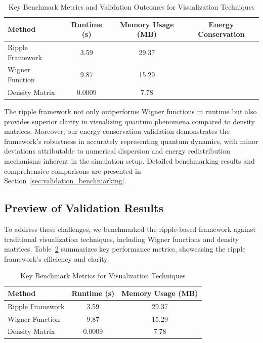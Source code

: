 \documentclass[12pt]{article}
\newcommand{\cmark}{\ding{51}} %
\newcommand{\xmark}{\ding{55}} %
\begin{document}
\begin{table}[H]
\centering
\caption{Key Benchmark Metrics and Validation Outcomes for Visualization Techniques}
\begin{tabular}{|l|c|c|c|}
    \hline
    \textbf{Method} & \textbf{Runtime (s)} & \textbf{Memory Usage (MB)} & \textbf{Energy Conservation} \\
    \hline
    Ripple Framework    & 3.59        & 29.37             & \cmark \\
    Wigner Function     & 9.87        & 15.29             & \xmark \\
    Density Matrix      & 0.0009      & 7.78              & \xmark \\
    \hline
\end{tabular}
\label{tab:validation_results}
\end{table}

The ripple framework not only outperforms Wigner functions in runtime but also provides superior clarity in visualizing quantum phenomena compared to density matrices. Moreover, our energy conservation validation demonstrates the framework's robustness in accurately representing quantum dynamics, with minor deviations attributable to numerical dispersion and energy redistribution mechanisms inherent in the simulation setup. Detailed benchmarking results and comprehensive comparisons are presented in Section~\ref{sec:validation_benchmarking}.

\subsection{Preview of Validation Results}
To address these challenges, we benchmarked the ripple-based framework against traditional visualization techniques, including Wigner functions and density matrices. Table~\ref{tab:preview_results} summarizes key performance metrics, showcasing the ripple framework's efficiency and clarity.

\begin{table}[H]
\centering
\caption{Key Benchmark Metrics for Visualization Techniques}
\begin{tabular}{|l|c|c|}
    \hline
    \textbf{Method} & \textbf{Runtime (s)} & \textbf{Memory Usage (MB)} \\
    \hline
    Ripple Framework    & 3.59        & 29.37             \\
    Wigner Function     & 9.87        & 15.29             \\
    Density Matrix      & 0.0009      & 7.78              \\
    \hline
\end{tabular}
\label{tab:preview_results}
\end{table}
\end{document}
